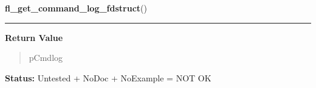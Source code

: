 \hspace{.8\funcindent}\begin{boxedminipage}{\funcwidth}

    \raggedright \textbf{fl\_get\_command\_log\_fdstruct}()

    \vspace{-1.5ex}

    \rule{\textwidth}{0.5\fboxrule}
\setlength{\parskip}{2ex}
\setlength{\parskip}{1ex}
      \textbf{Return Value}
    \vspace{-1ex}

      \begin{quote}
      pCmdlog

      \end{quote}

\textbf{Status:} Untested + NoDoc + NoExample = NOT OK



    \end{boxedminipage}

    \label{xformslib:library:fl_exe_command}

    \vspace{0.5ex}

